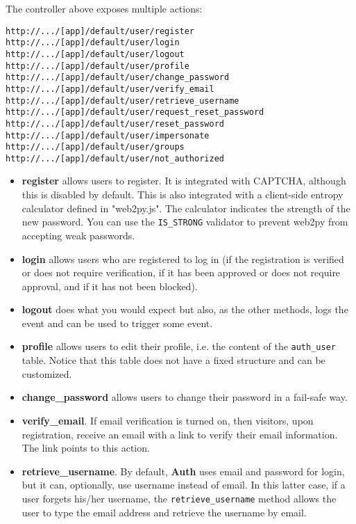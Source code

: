 \documentclass[justified,sixbynine,notoc]{tufte-book}
\def\ft{\small\tt}
\def\inxx#1{\index{#1}}
\begin{document}
\begin{fullwidth}
\inxx{auth.impersonate} \inxx{auth.is\_impersonating}

The controller above exposes multiple actions:
\begin{lstlisting}[keywords={}]
http://.../[app]/default/user/register
http://.../[app]/default/user/login
http://.../[app]/default/user/logout
http://.../[app]/default/user/profile
http://.../[app]/default/user/change_password
http://.../[app]/default/user/verify_email
http://.../[app]/default/user/retrieve_username
http://.../[app]/default/user/request_reset_password
http://.../[app]/default/user/reset_password
http://.../[app]/default/user/impersonate
http://.../[app]/default/user/groups
http://.../[app]/default/user/not_authorized
\end{lstlisting}
\begin{itemize}
\item {\bf register} allows users to register. It is integrated with CAPTCHA, although this is disabled by default. This is also integrated with a client-side entropy calculator defined in "web2py.js". The calculator indicates the strength of the new password. You can use the {\ft IS\_STRONG} validator to prevent web2py from accepting weak passwords.

\item {\bf login} allows users who are registered to log in (if the registration is verified or does not require verification, if it has been approved or does not require approval, and if it has not been blocked).

\item {\bf logout} does what you would expect but also, as the other methods, logs the event and can be used to trigger some event.

\item {\bf profile} allows users to edit their profile, i.e. the content of the {\ft auth\_user} table. Notice that this table does not have a fixed structure and can be customized.

\item {\bf change\_password} allows users to change their password in a fail-safe way.

\item {\bf verify\_email}. If email verification is turned on, then visitors, upon registration, receive an email with a link to verify their email information. The link points to this action.

\item {\bf retrieve\_username}. By default, {\bf Auth} uses email and password for login, but it can, optionally, use username instead of email. In this latter case, if a user forgets his/her username, the {\ft retrieve\_username} method allows the user to type the email address and retrieve the username by email.


\end{itemize}
\end{fullwidth}
\end{document}

